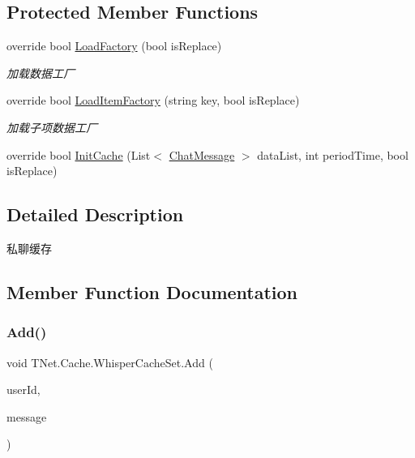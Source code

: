 \subsection*{Protected Member Functions}
\begin{DoxyCompactItemize}
\item 
override bool \mbox{\hyperlink{class_t_net_1_1_cache_1_1_whisper_cache_set_a99ac6a03ed7af2e5de288132294786ea}{Load\+Factory}} (bool is\+Replace)
\begin{DoxyCompactList}\small\item\em 加载数据工厂 \end{DoxyCompactList}\item 
override bool \mbox{\hyperlink{class_t_net_1_1_cache_1_1_whisper_cache_set_a298782e3470d365db9b032778a874590}{Load\+Item\+Factory}} (string key, bool is\+Replace)
\begin{DoxyCompactList}\small\item\em 加载子项数据工厂 \end{DoxyCompactList}\item 
override bool \mbox{\hyperlink{class_t_net_1_1_cache_1_1_whisper_cache_set_ad3929c10b9f25cc680ad3ff0348f53d3}{Init\+Cache}} (List$<$ \mbox{\hyperlink{class_t_net_1_1_model_1_1_chat_message}{Chat\+Message}} $>$ data\+List, int period\+Time, bool is\+Replace)
\end{DoxyCompactItemize}


\subsection{Detailed Description}
私聊缓存 



\subsection{Member Function Documentation}
\mbox{\label{class_t_net_1_1_cache_1_1_whisper_cache_set_a15b655eac64df17e8ae33684b97b70c5}} 
\subsubsection{\texorpdfstring{Add()}{Add()}}
{\footnotesize\ttfamily void T\+Net.\+Cache.\+Whisper\+Cache\+Set.\+Add (\begin{DoxyParamCaption}\item[{int}]{user\+Id,  }\item[{\mbox{\hyperlink{class_t_net_1_1_model_1_1_chat_message}{Chat\+Message}}}]{message }\end{DoxyParamCaption})}






